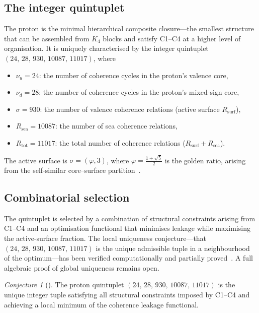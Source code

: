 \documentclass[11pt,a4paper]{article}
\theoremstyle{plain}
\theoremstyle{definition}
\theoremstyle{remark}
\newtheorem{conjecture}[theorem]{Conjecture}
\newcommand{\quintuplet}{(24,\,28,\,930,\,10087,\,11017)}
\begin{document}
\subsection{The integer quintuplet}
\label{subsec:quintuplet}
The proton is the minimal hierarchical composite closure---the smallest structure that can be assembled from $K_4$ blocks and satisfy C1--C4 at a higher level of organisation. It is uniquely characterised by the integer quintuplet $\quintuplet$, where
\begin{itemize}
\item $\nu_u = 24$: the number of coherence cycles in the proton's valence core,
\item $\nu_d = 28$: the number of coherence cycles in the proton's mixed-sign core,
\item $\sigma = 930$: the number of valence coherence relations (active surface $R_{\mathrm{surf}}$),
\item $R_{\mathrm{sea}} = 10087$: the number of sea coherence relations,
\item $R_{\mathrm{tot}} = 11017$: the total number of coherence relations ($R_{\mathrm{surf}}+R_{\mathrm{sea}}$).
\end{itemize}
The active surface is $\sigma=(\varphi,3)$, where $\varphi=\tfrac{1+\sqrt{5}}{2}$ is the golden ratio, arising from the self-similar core--surface partition~\cite{D05,D12}.

\subsection{Combinatorial selection}
\label{subsec:combinatorial}
The quintuplet is selected by a combination of structural constraints arising from C1--C4 and an optimisation functional that minimises leakage while maximising the active-surface fraction. The local uniqueness conjecture---that $\quintuplet$ is the unique admissible tuple in a neighbourhood of the optimum---has been verified computationally and partially proved~\cite{D16,D16b}. A full algebraic proof of global uniqueness remains open.

\begin{conjecture}[\cite{D16b}]
\label{conj:uniqueness}
The proton quintuplet $\quintuplet$ is the unique integer tuple satisfying all structural constraints imposed by C1--C4 and achieving a local minimum of the coherence leakage functional.
\end{conjecture}

\end{document}
